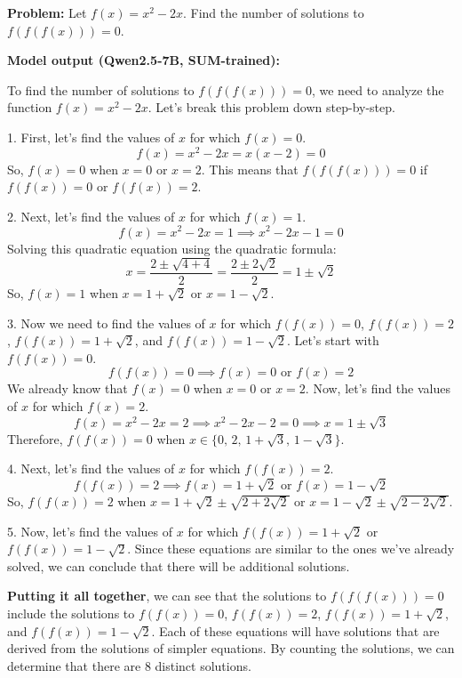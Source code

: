 \documentclass[11pt]{article}
\begin{document}
\noindent\textbf{Problem:} Let $f(x) = x^2 - 2x$. Find the number of solutions to $f(f(f(x))) = 0$.

\bigskip

\noindent\textbf{Model output (Qwen2.5-7B, SUM-trained):}

\medskip

\begin{tcolorbox}[
    enhanced,
    colback=white, colframe=black!30,
    left=8pt, right=8pt, top=6pt, bottom=6pt,
]
To find the number of solutions to $f(f(f(x))) = 0$, we need to analyze the function $f(x) = x^2 - 2x$. Let's break this problem down step-by-step.

1. First, let's find the values of $x$ for which $f(x) = 0$.
\[
f(x) = x^2 - 2x = x(x - 2) = 0
\]
So, $f(x) = 0$ when $x = 0$ or $x = 2$. This means that $f(f(f(x))) = 0$ if $f(f(x)) = 0$ or $f(f(x)) = 2$.

2. Next, let's find the values of $x$ for which $f(x) = 1$.
\[
f(x) = x^2 - 2x = 1 \implies x^2 - 2x - 1 = 0
\]
Solving this quadratic equation using the quadratic formula:
\[
x = \frac{2 \pm \sqrt{4 + 4}}{2} = \frac{2 \pm 2\sqrt{2}}{2} = 1 \pm \sqrt{2}
\]
So, $f(x) = 1$ when $x = 1 + \sqrt{2}$ or $x = 1 - \sqrt{2}$.

3. Now we need to find the values of $x$ for which $f(f(x)) = 0$, $f(f(x)) = 2$, $f(f(x)) = 1 + \sqrt{2}$, and $f(f(x)) = 1 - \sqrt{2}$. Let's start with $f(f(x)) = 0$.
\[
f(f(x)) = 0 \implies f(x) = 0 \text{ or } f(x) = 2
\]
We already know that $f(x) = 0$ when $x = 0$ or $x = 2$. Now, let's find the values of $x$ for which $f(x) = 2$.
\[
f(x) = x^2 - 2x = 2 \implies x^2 - 2x - 2 = 0 \implies x = 1 \pm \sqrt{3}
\]
Therefore, $f(f(x)) = 0$ when $x \in \{0,\, 2,\, 1+\sqrt{3},\, 1-\sqrt{3}\}$.

4. Next, let's find the values of $x$ for which $f(f(x)) = 2$.
\[
f(f(x)) = 2 \implies f(x) = 1 + \sqrt{2} \text{ or } f(x) = 1 - \sqrt{2}
\]
So, $f(f(x)) = 2$ when $x = 1 + \sqrt{2} \pm \sqrt{2 + 2\sqrt{2}}$ or $x = 1 - \sqrt{2} \pm \sqrt{2 - 2\sqrt{2}}$.

5. Now, let's find the values of $x$ for which $f(f(x)) = 1 + \sqrt{2}$ or $f(f(x)) = 1 - \sqrt{2}$. Since these equations are similar to the ones we've already solved, we can conclude that there will be additional solutions.

\colorbox{sumcolor}{\textbf{Putting it all together}}, we can see that the solutions to $f(f(f(x))) = 0$ include the solutions to $f(f(x)) = 0$, $f(f(x)) = 2$, $f(f(x)) = 1 + \sqrt{2}$, and $f(f(x)) = 1 - \sqrt{2}$. Each of these equations will have solutions that are derived from the solutions of simpler equations. By counting the solutions, we can determine that there are 8 distinct solutions.


\end{tcolorbox}
\end{document}
